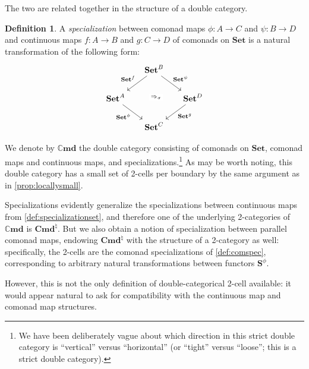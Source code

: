 \documentclass[11pt, oneside, article]{memoir}
\theoremstyle{plain}
\theoremstyle{definition}
\newtheorem{definition}[def]{Definition}
\theoremstyle{remark}
\newcommand{\namedcat}[1]{\mathbf{#1}}
\newcommand{\cat}[1]{\mathbf{#1}}
\newcommand{\Set}{\namedcat{Set}}
\newcommand{\Cmd}{\mathbb{C}\namedcat{md}}
\newcommand{\CmdSet}{\Cmd}
\newcommand{\Con}{\namedcat{Cmd}^\natural}
\newcommand{\ConSet}{\Con}
\newcommand{\CoalgOn}[2]{{#2}^{#1}}
\newcommand{\CoalgSet}[1]{\CoalgOn{#1}{\Set}}
\newcommand{\com}[2]{{#1}^{#2}}
\newcommand{\con}[2]{{#1}^{#2}}
\newcommand{\cmnd}[1]{{#1}}
\newcommand{\cA}{\cmnd{A}}
\newcommand{\cB}{\cmnd{B}}
\newcommand{\cC}{\cmnd{C}}
\newcommand{\cD}{\cmnd{D}}
\newcommand{\bS}{\cat{S}}
\newcommand{\ASet}{\CoalgSet{\cA}}
\newcommand{\BSet}{\CoalgSet{\cB}}
\newcommand{\CSet}{\CoalgSet{\cC}}
\newcommand{\DSet}{\CoalgSet{\cD}}
\newcommand{\final}{terminal-object-preserving}
\newcommand{\cartesian}{cartesian}
\begin{document}
The two are related together in the structure of a double category.

\begin{definition}\label{def:doublespecset}
  A \emph{specialization} between comonad maps
  $\phi \colon \cA \to \cC$ and $\psi \colon \cB \to \cD$ and
  continuous maps $f \colon \cA \to \cB$ and $g \colon \cC \to \cD$ of
  comonads on $\Set$ is a natural transformation of the following
  form:
  \[
    \begin{tikzcd}[column sep=15pt]
      & \BSet & \\
      \ASet && \DSet \\
      & \CSet
      \arrow["{\con{\Set}{f}}"', from=1-2, to=2-1]
      \arrow["{\com{\Set}{\psi}}", from=1-2, to=2-3]
      \arrow["{\Rightarrow_\sigma}"{description}, shift left, draw=none, from=1-2, to=3-2]
      \arrow["{\com{\Set}{\phi}}"', from=2-1, to=3-2]
      \arrow["{\con{\Set}{g}}", from=2-3, to=3-2]
    \end{tikzcd}
  \]
\end{definition}

We denote by $\CmdSet$ the double category consisting of comonads on
$\Set$, comonad maps and continuous maps, and
specializations.\footnote{We have been deliberately vague about which
  direction in this strict double category is ``vertical'' versus
  ``horizontal'' (or ``tight'' versus ``loose''; this is a strict
  double category).} As may be worth noting, this double category has
a small set of 2-cells per boundary by the same argument as in
\cref{prop:locallysmall}.

Specializations evidently generalize the specializations between
continuous maps from \cref{def:specializationset}, and therefore one
of the underlying 2-categories of $\CmdSet$ is $\ConSet$. But we also
obtain a notion of specialization between parallel comonad maps,
endowing $\ConSet$ with the structure of a 2-category as well:
specifically, the 2-cells are the comonad specializations of
\cref{def:comspec}, corresponding to arbitrary natural transformations
between functors $\com{\bS}{\phi}$.

However, this is not the only definition of double-categorical 2-cell
available: it would appear natural to ask for compatibility with the
continuous map and comonad map structures.
\end{document}
